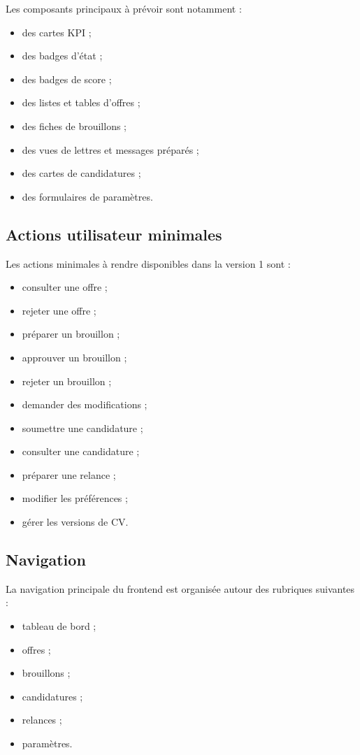 \documentclass[11pt,a4paper]{article}
\begin{document}
Les composants principaux à prévoir sont notamment :

\begin{itemize}
    \item des cartes KPI ;
    \item des badges d’état ;
    \item des badges de score ;
    \item des listes et tables d’offres ;
    \item des fiches de brouillons ;
    \item des vues de lettres et messages préparés ;
    \item des cartes de candidatures ;
    \item des formulaires de paramètres.
\end{itemize}

\subsection{Actions utilisateur minimales}

Les actions minimales à rendre disponibles dans la version 1 sont :

\begin{itemize}
    \item consulter une offre ;
    \item rejeter une offre ;
    \item préparer un brouillon ;
    \item approuver un brouillon ;
    \item rejeter un brouillon ;
    \item demander des modifications ;
    \item soumettre une candidature ;
    \item consulter une candidature ;
    \item préparer une relance ;
    \item modifier les préférences ;
    \item gérer les versions de CV.
\end{itemize}

\subsection{Navigation}

La navigation principale du frontend est organisée autour des rubriques suivantes :

\begin{itemize}
    \item tableau de bord ;
    \item offres ;
    \item brouillons ;
    \item candidatures ;
    \item relances ;
    \item paramètres.
\end{itemize}
\end{document}
